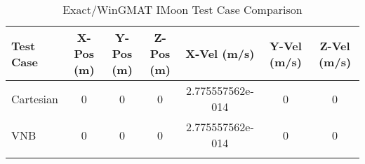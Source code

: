\begin{table}[htbp!]
\centering
\caption{ Exact/WinGMAT IMoon Test Case Comparison}
      \begin{tabular}{lcccccc}
      \hline\hline
          Test Case & X-Pos (m) & Y-Pos (m) & Z-Pos (m) & X-Vel (m/s) & Y-Vel (m/s) & Z-Vel (m/s) \\
         \hline
         Cartesian & 0 & 0 & 0 & 2.775557562e-014 & 0 & 0 \\
         VNB & 0 & 0 & 0 & 2.775557562e-014 & 0 & 0 \\
      \hline\hline
      \label{Table: IMoon Exact-WinGMAT Table} 
\end{tabular}
\end{table}
